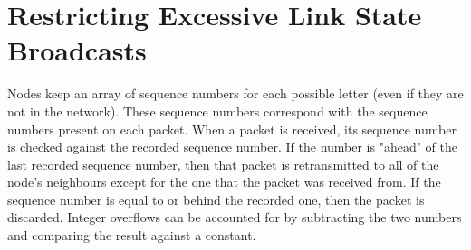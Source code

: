 \documentclass[a4paper]{article}
\begin{document}
\section{Restricting Excessive Link State Broadcasts}
Nodes keep an array of sequence numbers for each possible letter (even if they are not in the network). These sequence numbers
correspond with the sequence numbers present on each packet. When a packet is received, its sequence number is checked against
the recorded sequence number. If the number is "ahead" of the last recorded sequence number, then that packet is retransmitted
to all of the node's neighbours except for the one that the packet was received from. If the sequence number is equal to or behind
the recorded one, then the packet is discarded. Integer overflows can be accounted for by subtracting the two numbers and
comparing the result against a constant.
\end{document}
